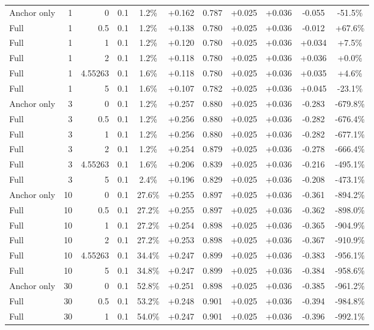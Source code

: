 \begin{table}[htbp]
\begin{tabular}{lrrrccccccc}
Anchor only & 1 & 0 & 0.1 & 1.2\% & +0.162 & 0.787 & +0.025 & +0.036 & -0.055 & -51.5\% \\
Full & 1 & 0.5 & 0.1 & 1.2\% & +0.138 & 0.780 & +0.025 & +0.036 & -0.012 & +67.6\% \\
Full & 1 & 1 & 0.1 & 1.2\% & +0.120 & 0.780 & +0.025 & +0.036 & +0.034 & +7.5\% \\
Full & 1 & 2 & 0.1 & 1.2\% & +0.118 & 0.780 & +0.025 & +0.036 & +0.036 & +0.0\% \\
Full & 1 & 4.55263 & 0.1 & 1.6\% & +0.118 & 0.780 & +0.025 & +0.036 & +0.035 & +4.6\% \\
Full & 1 & 5 & 0.1 & 1.6\% & +0.107 & 0.782 & +0.025 & +0.036 & +0.045 & -23.1\% \\
Anchor only & 3 & 0 & 0.1 & 1.2\% & +0.257 & 0.880 & +0.025 & +0.036 & -0.283 & -679.8\% \\
Full & 3 & 0.5 & 0.1 & 1.2\% & +0.256 & 0.880 & +0.025 & +0.036 & -0.282 & -676.4\% \\
Full & 3 & 1 & 0.1 & 1.2\% & +0.256 & 0.880 & +0.025 & +0.036 & -0.282 & -677.1\% \\
Full & 3 & 2 & 0.1 & 1.2\% & +0.254 & 0.879 & +0.025 & +0.036 & -0.278 & -666.4\% \\
Full & 3 & 4.55263 & 0.1 & 1.6\% & +0.206 & 0.839 & +0.025 & +0.036 & -0.216 & -495.1\% \\
Full & 3 & 5 & 0.1 & 2.4\% & +0.196 & 0.829 & +0.025 & +0.036 & -0.208 & -473.1\% \\
Anchor only & 10 & 0 & 0.1 & 27.6\% & +0.255 & 0.897 & +0.025 & +0.036 & -0.361 & -894.2\% \\
Full & 10 & 0.5 & 0.1 & 27.2\% & +0.255 & 0.897 & +0.025 & +0.036 & -0.362 & -898.0\% \\
Full & 10 & 1 & 0.1 & 27.2\% & +0.254 & 0.898 & +0.025 & +0.036 & -0.365 & -904.9\% \\
Full & 10 & 2 & 0.1 & 27.2\% & +0.253 & 0.898 & +0.025 & +0.036 & -0.367 & -910.9\% \\
Full & 10 & 4.55263 & 0.1 & 34.4\% & +0.247 & 0.899 & +0.025 & +0.036 & -0.383 & -956.1\% \\
Full & 10 & 5 & 0.1 & 34.8\% & +0.247 & 0.899 & +0.025 & +0.036 & -0.384 & -958.6\% \\
Anchor only & 30 & 0 & 0.1 & 52.8\% & +0.251 & 0.898 & +0.025 & +0.036 & -0.385 & -961.2\% \\
Full & 30 & 0.5 & 0.1 & 53.2\% & +0.248 & 0.901 & +0.025 & +0.036 & -0.394 & -984.8\% \\
Full & 30 & 1 & 0.1 & 54.0\% & +0.247 & 0.901 & +0.025 & +0.036 & -0.396 & -992.1\% \\

\end{tabular}
\end{table}
